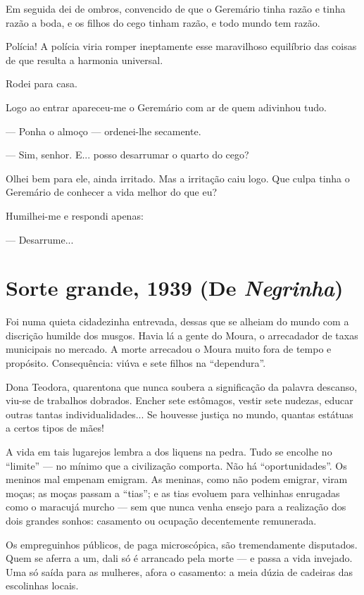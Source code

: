 Em seguida dei de ombros, convencido de que o Geremário tinha razão e
tinha razão a boda, e os filhos do cego tinham razão, e todo mundo tem
razão.

Polícia! A polícia viria romper ineptamente esse maravilhoso equilíbrio
das coisas de que resulta a harmonia universal.

Rodei para casa.

Logo ao entrar apareceu-me o Geremário com ar de quem adivinhou tudo.

--- Ponha o almoço --- ordenei-lhe secamente.

--- Sim, senhor. E... posso desarrumar o quarto do cego?

Olhei bem para ele, ainda irritado. Mas a irritação caiu logo. Que culpa
tinha o Geremário de conhecer a vida melhor do que eu?

Humilhei-me e respondi apenas:

--- Desarrume...

\chapter{Sorte grande, 1939 (De \emph{Negrinha})}

Foi numa quieta cidadezinha entrevada, dessas que se alheiam do mundo
com a discrição humilde dos musgos. Havia lá a gente do Moura, o
arrecadador de taxas municipais no mercado. A morte arrecadou o Moura
muito fora de tempo e propósito. Consequência: viúva e sete filhos na
``dependura''.

Dona Teodora, quarentona que nunca soubera a significação da palavra
descanso, viu-se de trabalhos dobrados. Encher sete estômagos, vestir
sete nudezas, educar outras tantas individualidades... Se houvesse
justiça no mundo, quantas estátuas a certos tipos de mães!

A vida em tais lugarejos lembra a dos liquens na pedra. Tudo se encolhe
no ``limite'' --- no mínimo que a civilização comporta. Não há
``oportunidades''. Os meninos mal empenam emigram. As meninas, como não
podem emigrar, viram moças; as moças passam a ``tias''; e as tias
evoluem para velhinhas enrugadas como o maracujá murcho --- sem que
nunca venha ensejo para a realização dos dois grandes sonhos: casamento
ou ocupação decentemente remunerada.

Os empreguinhos públicos, de paga microscópica, são tremendamente
disputados. Quem se aferra a um, dali só é arrancado pela morte --- e
passa a vida invejado. Uma só saída para as mulheres, afora o casamento:
a meia dúzia de cadeiras das escolinhas locais.

